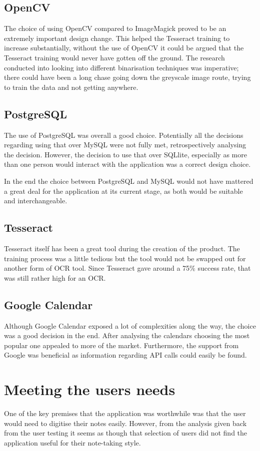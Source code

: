 \subsection{OpenCV}
The choice of using OpenCV compared to ImageMagick proved to be an extremely important design change. This helped the Tesseract training to increase substantially, without the use of OpenCV it could be argued that the Tesseract training would never have gotten off the ground. The research conducted into looking into different binarisation techniques was imperative; there could have been a long chase going down the greyscale image route, trying to train the data and not getting anywhere.

\subsection{PostgreSQL}
The use of PostgreSQL was overall a good choice. Potentially all the decisions regarding using that over MySQL were not fully met, retrospectively analysing the decision.  However, the decision to use that over SQLlite, especially as more than one person would interact with the application was a correct design choice.

In the end the choice between PostgreSQL and MySQL would not have mattered a great deal for the application at its current stage, as both would be suitable and interchangeable.

\subsection{Tesseract}
Tesseract itself has been a great tool during the creation of the product. The training process was a little tedious but the tool would not be swapped out for another form of OCR tool. Since Tesseract gave around a 75\% success rate, that was still rather high for an OCR.

\subsection{Google Calendar}
Although Google Calendar exposed a lot of complexities along the way, the choice was a good decision in the end. After analysing the calendars choosing the most popular one appealed to more of the market. Furthermore, the support from Google was beneficial as information regarding API calls could easily be found.

\section{Meeting the users needs}
One of the key premises that the application was worthwhile was that the user would need to digitise their notes easily. However, from the analysis given back from the user testing it seems as though that selection of users did not find the application useful for their note-taking style.

